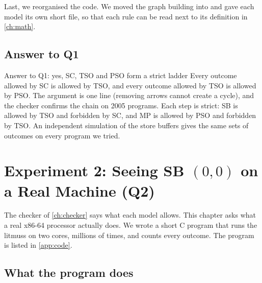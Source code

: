 Last, we reorganised the code. We moved the graph building into  and gave each model its own short file, so that each rule can be read next to its definition in \cref{ch:math}.

\section{Answer to Q1}
\label{sec:q1}

\begin{resultbox}{Answer to Q1: yes, SC, TSO and PSO form a strict ladder}
Every outcome allowed by SC is allowed by TSO, and every outcome allowed by TSO is allowed by PSO. The argument is one line (removing arrows cannot create a cycle), and the checker confirms the chain on 2005 programs. Each step is strict: SB  is allowed by TSO and forbidden by SC, and MP  is allowed by PSO and forbidden by TSO. An independent simulation of the store buffers gives the same sets of outcomes on every program we tried.
\end{resultbox}


\chapter{Experiment 2: Seeing SB \texorpdfstring{$(0,0)$}{(0,0)} on a Real Machine (Q2)}
\label{ch:hw}

The checker of \cref{ch:checker} says what each model allows. This chapter asks what a real x86-64 processor actually does. We wrote a short C program that runs the \gls{litmus}s on two cores, millions of times, and counts every outcome. The program is listed in \cref{app:code}.

\section{What the program does}
\label{sec:harness}

